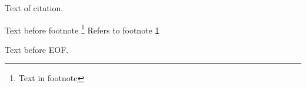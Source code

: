 \documentclass{article}
\begin{document}
    Text \autocite{bookLabel1} of citation.

    Text before footnote \footnote{\label{ft1}Text in footnote}
    Refers to footnote \ref{ft1}

    \printbibliography[heading=none]

    Text before EOF.
\end{document}
